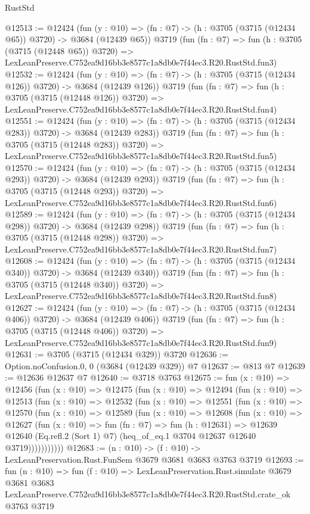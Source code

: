 \begin{lexlean}{RustStd}
\begin{coremodule}
@12513 := @12424
    (fun (y : @10) => (fn : @7) -> (h : @3705 (@3715 (@12434 @65)) @3720) -> @3684 (@12439 @65))
    @3719
    (fun (fn : @7) =>
    fun (h : @3705 (@3715 (@12448 @65)) @3720) =>
    LexLeanPreserve.C752ea9d16bb3e8577c1a8db0e7f44ec3.R20.RustStd.fun3)
@12532 := @12424
    (fun (y : @10) => (fn : @7) -> (h : @3705 (@3715 (@12434 @126)) @3720) -> @3684 (@12439 @126))
    @3719
    (fun (fn : @7) =>
    fun (h : @3705 (@3715 (@12448 @126)) @3720) =>
    LexLeanPreserve.C752ea9d16bb3e8577c1a8db0e7f44ec3.R20.RustStd.fun4)
@12551 := @12424
    (fun (y : @10) => (fn : @7) -> (h : @3705 (@3715 (@12434 @283)) @3720) -> @3684 (@12439 @283))
    @3719
    (fun (fn : @7) =>
    fun (h : @3705 (@3715 (@12448 @283)) @3720) =>
    LexLeanPreserve.C752ea9d16bb3e8577c1a8db0e7f44ec3.R20.RustStd.fun5)
@12570 := @12424
    (fun (y : @10) => (fn : @7) -> (h : @3705 (@3715 (@12434 @293)) @3720) -> @3684 (@12439 @293))
    @3719
    (fun (fn : @7) =>
    fun (h : @3705 (@3715 (@12448 @293)) @3720) =>
    LexLeanPreserve.C752ea9d16bb3e8577c1a8db0e7f44ec3.R20.RustStd.fun6)
@12589 := @12424
    (fun (y : @10) => (fn : @7) -> (h : @3705 (@3715 (@12434 @298)) @3720) -> @3684 (@12439 @298))
    @3719
    (fun (fn : @7) =>
    fun (h : @3705 (@3715 (@12448 @298)) @3720) =>
    LexLeanPreserve.C752ea9d16bb3e8577c1a8db0e7f44ec3.R20.RustStd.fun7)
@12608 := @12424
    (fun (y : @10) => (fn : @7) -> (h : @3705 (@3715 (@12434 @340)) @3720) -> @3684 (@12439 @340))
    @3719
    (fun (fn : @7) =>
    fun (h : @3705 (@3715 (@12448 @340)) @3720) =>
    LexLeanPreserve.C752ea9d16bb3e8577c1a8db0e7f44ec3.R20.RustStd.fun8)
@12627 := @12424
    (fun (y : @10) => (fn : @7) -> (h : @3705 (@3715 (@12434 @406)) @3720) -> @3684 (@12439 @406))
    @3719
    (fun (fn : @7) =>
    fun (h : @3705 (@3715 (@12448 @406)) @3720) =>
    LexLeanPreserve.C752ea9d16bb3e8577c1a8db0e7f44ec3.R20.RustStd.fun9)
@12631 := @3705 (@3715 (@12434 @329)) @3720
@12636 := Option.noConfusion.{0, 0} (@3684 (@12439 @329)) @7
@12637 := @813 @7
@12639 := @12636 @12637 @7
@12640 := @3718 @3763
@12675 := fun (x : @10) =>
  @12456
    (fun (x : @10) =>
    @12475
      (fun (x : @10) =>
      @12494
        (fun (x : @10) =>
        @12513
          (fun (x : @10) =>
          @12532
            (fun (x : @10) =>
            @12551
              (fun (x : @10) =>
              @12570
                (fun (x : @10) =>
                @12589
                  (fun (x : @10) =>
                  @12608
                    (fun (x : @10) =>
                    @12627
                      (fun (x : @10) =>
                      fun (fn : @7) =>
                      fun (h : @12631) =>
                      @12639
                        @12640
                        (Eq.refl.{2} (Sort 1) @7)
                        (heq_of_eq.{1} @3704 @12637 @12640 @3719)))))))))))
@12683 := (n : @10) -> (f : @10) -> LexLeanPreservation.Rust.FunSem @3679 @3681 @3683 @3763 @3719
@12693 := fun (n : @10) =>
  fun (f : @10) =>
  LexLeanPreservation.Rust.simulate
    @3679
    @3681
    @3683
    LexLeanPreserve.C752ea9d16bb3e8577c1a8db0e7f44ec3.R20.RustStd.crate_ok
    @3763
    @3719
\end{coremodule}
\end{lexlean}
